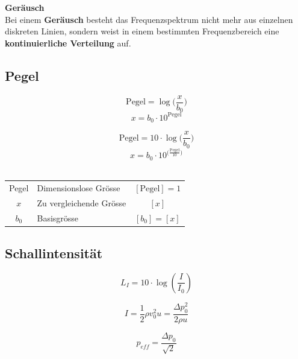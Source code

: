 \textbf{Geräusch} \\
Bei einem \textbf{Geräusch} besteht das Frequenzspektrum nicht mehr
aus einzelnen diskreten Linien, sondern weist in einem
bestimmten Frequenzbereich eine  \textbf{kontinuierliche Verteilung} auf. \\




\subsection{Pegel}\label{Pegel}

\begin{minipage}{0.48\linewidth}
$$ \boxed{ \text{Pegel} = \log \Big( \frac{x}{b_0} \Big) } $$
$$ \boxed{ x = b_0 \cdot 10^{\text{Pegel} } } $$ 

\end{minipage}
\hfill
\begin{minipage}{0.48\linewidth}
$$ \boxed{ \text{Pegel} = 10 \cdot \log \Big( \frac{x}{b_0} \Big) } $$ 
$$ \boxed{ x = b_0 \cdot 10^{\Big( \frac{\text{Pegel}}{10} \Big) } } $$ \\
\end{minipage}

\renewcommand{\arraystretch}{1.3}
\begin{tabular}{clc}
Pegel & Dimensionslose Grösse & $[\text{Pegel}] =  1$ \\
$x$ & Zu vergleichende Grösse & $[x]$ \\
$b_0$ & Basisgrösse & $[b_0] = [x]$ \\
\end{tabular}
\renewcommand{\arraystretch}{1}

\raggedright



\subsection{Schallintensität}

\begin{minipage}{0.28\linewidth}
	$$ \boxed{ L_I = 10 \cdot \log \left( \frac{I}{I_0} \right) } $$ 
\end{minipage}
\hfill
\begin{minipage}{0.40\linewidth}
	$$ \boxed{I = \frac{1}{2}\rho v_0^2 u = \frac{\Delta p_0^2}{2 \rho u} }$$ 
\end{minipage}
\hfill
\begin{minipage}{0.28\linewidth}
	$$ \boxed{ p_{eff} = \frac{\Delta p_0}{\sqrt{2}} } $$ 
\end{minipage}

